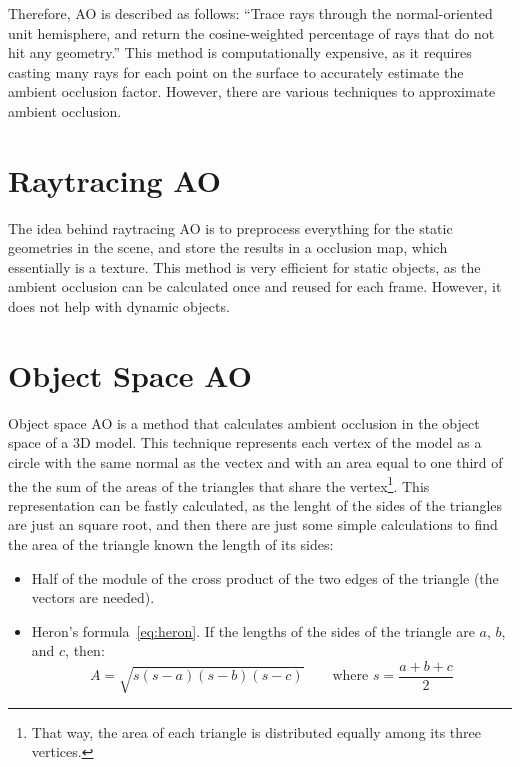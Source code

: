 Therefore, AO is described as follows: ``Trace rays through the normal-oriented unit hemisphere, and return the cosine-weighted percentage of rays that do not hit any geometry.'' This method is computationally expensive, as it requires casting many rays for each point on the surface to accurately estimate the ambient occlusion factor. However, there are various techniques to approximate ambient occlusion.

\section{Raytracing AO}

The idea behind raytracing AO is to preprocess everything for the static geometries in the scene, and store the results in a occlusion map, which essentially is a texture. This method is very efficient for static objects, as the ambient occlusion can be calculated once and reused for each frame. However, it does not help with dynamic objects.

\section{Object Space AO}

Object space AO is a method that calculates ambient occlusion in the object space of a 3D model. This technique represents each vertex of the model as a circle with the same normal as the vectex and with an area equal to one third of the the sum of the areas of the triangles that share the vertex\footnote{That way, the area of each triangle is distributed equally among its three vertices.}. 
This representation can be fastly calculated, as the lenght of the sides of the triangles are just an square root, and then there are just some simple calculations to find the area of the triangle known the length of its sides:
\begin{itemize}
    \item Half of the module of the cross product of the two edges of the triangle (the vectors are needed).
    \item Heron's formula~\eqref{eq:heron}. If the lengths of the sides of the triangle are $a$, $b$, and $c$, then:
    \begin{equation}\label{eq:heron}
        A = \sqrt{s(s-a)(s-b)(s-c)}\qquad \text{where } s = \frac{a + b + c}{2}
    \end{equation}
\end{itemize}

